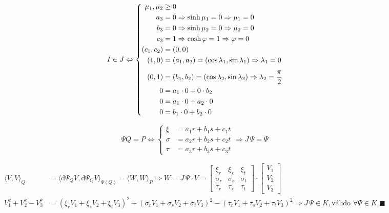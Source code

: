 \documentclass[10pt,a4paper]{article}
\begin{document}
		\begin{equation*}
		I \in J \Leftrightarrow
			\left\{\begin{aligned}
				\mu_1, \mu_2 &\ge 0 \\
				a_3 &= 0 \Rightarrow \sinh \mu_1 = 0 \Rightarrow \mu_1 = 0 \\
				b_3 &= 0 \Rightarrow \sinh \mu_2 = 0 \Rightarrow \mu_2 = 0 \\
				c_3 &= 1 \Rightarrow \cosh \varphi = 1 \Rightarrow \varphi = 0 \\
			    (c_1, c_2) &= (0, 0) \\
			    (1,0) &= (a_1, a_2) = (\cos \lambda_1, \sin \lambda_1) \Rightarrow \lambda_1 = 0 \\
			    (0,1) &= (b_1, b_2) = (\cos \lambda_2, \sin \lambda_2) \Rightarrow \lambda_2 = \cfrac{\pi}{2} \\
			    0 &= a_1 \cdot 0 + 0 \cdot b_2 \\
			    0 &= a_1 \cdot 0 + a_2 \cdot 0 \\
			    0 &= b_1 \cdot 0 + b_2 \cdot 0
			\end{aligned}
			\right.
		\end{equation*}

		\begin{equation*}
		\Psi Q = P \Leftrightarrow
			\left\{\begin{aligned}
			    \xi &= a_1 r + b_1 s + c_1 t \\
			    \sigma &= a_2 r + b_2 s + c_2 t \\
			    \tau &= a_3 r + b_3 s + c_3 t
			\end{aligned}
			\right. \Rightarrow J\,\Psi = \Psi
		\end{equation*}

		\begin{align*}
		\langle V, V\rangle_Q &= \langle \mathrm{d}\Psi_Q V, \mathrm{d}\Psi_Q V \rangle_{\Psi(Q)} = \langle W, W \rangle_P \Rightarrow W = J\,\Psi\cdot V = \left[ \begin{matrix} \xi_r & \xi_s & \xi_t \\ \sigma_r & \sigma_s & \sigma_t \\ \tau_r & \tau_s & \tau_t \end{matrix} \right] \cdot \left[ \begin{matrix} V_1 \\ V_2 \\ V_3 \end{matrix} \right] \\
		V_1^2 + V_2^2 - V_3^2 &= (\xi_r V_1 + \xi_s V_2 + \xi_t V_3)^2 + (\sigma_r V_1 + \sigma_s V_2 + \sigma_t V_3)^2 - (\tau_r V_1 + \tau_s V_2 + \tau_t V_3)^2 \Rightarrow J\,\Psi \in K, \text{v\'alido }\forall \Psi \in K\,\,\blacksquare
		\end{align*}
\end{document}
